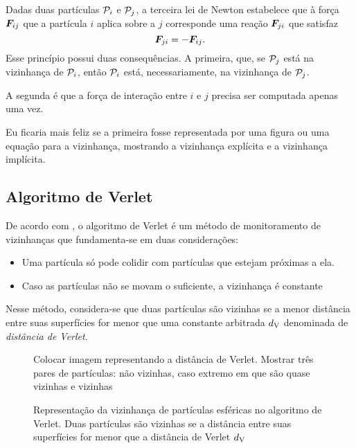 Dadas duas partículas \({\mathcal{P}}_{i}\) e \({\mathcal{P}}_{j}\), a terceira lei de Newton estabelece que à força \({\bm{F}}_{i j}\) que a partícula \(i\) aplica sobre a \(j\) corresponde uma reação \({\bm{F}}_{j i}\) que satisfaz
\begin{equation*}
	{\bm{F}}_{j i} = -{\bm{F}}_{i j}.
\end{equation*}
Esse princípio possui duas consequências. A primeira, que, se \({\mathcal{P}}_{j}\) está na vizinhança de \({\mathcal{P}}_{i}\), então \({\mathcal{P}}_{i}\) está, necessariamente, na vizinhança de \({\mathcal{P}}_{j}\).

A segunda é que a força de interação entre \(i\) e \(j\) precisa ser computada apenas uma vez.

\alert{Eu ficaria mais feliz se a primeira fosse representada por uma figura ou uma equação para a vizinhança, mostrando a vizinhança explícita e a vizinhança implícita.}

\subsection{Algoritmo de Verlet}

De acordo com , o algoritmo de Verlet é um método de monitoramento de vizinhanças que fundamenta-se em duas considerações:
\begin{itemize}
	\item Uma partícula só pode colidir com partículas que estejam próximas a ela.
	\item \alert{Caso as partículas não se movam o suficiente, a vizinhança é constante}
\end{itemize}

Nesse método, considera-se que duas partículas são vizinhas se a menor distância entre suas superfícies for menor que uma constante arbitrada \(d_{\text{V}}\) denominada de \textit{distância de Verlet}.

\begin{figure}[h]
	\caption{Representação da vizinhança de partículas esféricas no algoritmo de Verlet. Duas partículas são vizinhas se a distância entre suas superfícies for menor que a distância de Verlet \(d_{\text{V}}\)}
	\begin{center}
		\alert{Colocar imagem representando a distância de Verlet. Mostrar três pares de partículas: não vizinhas, caso extremo em que são quase vizinhas e vizinhas}
	\end{center}
	\label{fig:verlet_distance}
\end{figure}

